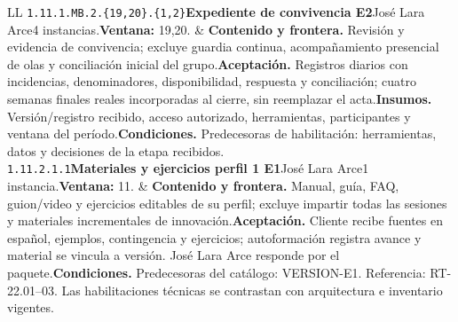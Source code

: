 \begin{longtable}{L{\tabcolsep\relax}L{\tabcolsep\relax}}
\texttt{1.\allowbreak{}11.\allowbreak{}1.\allowbreak{}MB.\allowbreak{}2.\allowbreak{}\{19,\allowbreak{}20\}.\allowbreak{}\{1,\allowbreak{}2\}}\newline{}\textbf{Expediente de convivencia E2}\newline{}José Lara Arce\newline{}4 instancias.\newline{}\textbf{Ventana:} 19,20. & \textbf{Contenido y frontera.} Revisión y evidencia de convivencia; excluye guardia continua, acompañamiento presencial de olas y conciliación inicial del grupo.\newline{}\textbf{Aceptación.} Registros diarios con incidencias, denominadores, disponibilidad, respuesta y conciliación; cuatro semanas finales reales incorporadas al cierre, sin reemplazar el acta.\newline{}\textbf{Insumos.} Versión/registro recibido, acceso autorizado, herramientas, participantes y ventana del período.\newline{}\textbf{Condiciones.} Predecesoras de habilitación: herramientas, datos y decisiones de la etapa recibidos.\\\hline
\texttt{1.\allowbreak{}11.\allowbreak{}2.\allowbreak{}1.\allowbreak{}1}\newline{}\textbf{Materiales y ejercicios perfil 1 E1}\newline{}José Lara Arce\newline{}1 instancia.\newline{}\textbf{Ventana:} 11. & \textbf{Contenido y frontera.} Manual, guía, FAQ, guion/video y ejercicios editables de su perfil; excluye impartir todas las sesiones y materiales incrementales de innovación.\newline{}\textbf{Aceptación.} Cliente recibe fuentes en español, ejemplos, contingencia y ejercicios; autoformación registra avance y material se vincula a versión. José Lara Arce responde por el paquete.\newline{}\textbf{Condiciones.} Predecesoras del catálogo: VERSION-E1. Referencia: RT-22.01--03. Las habilitaciones técnicas se contrastan con arquitectura e inventario vigentes.\\\hline

\end{longtable}
